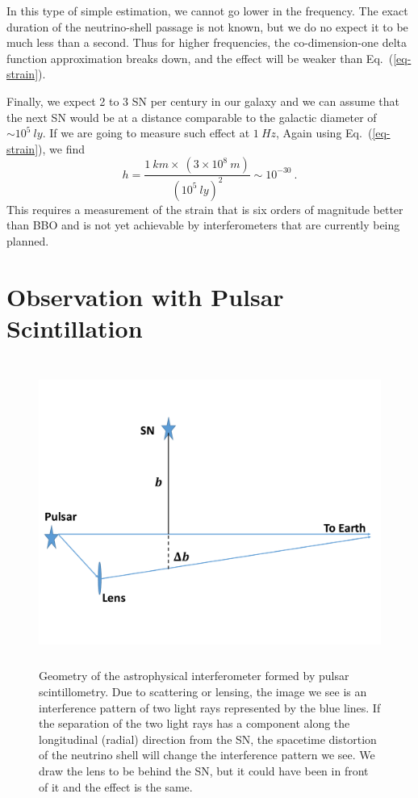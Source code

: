 \documentclass[aps,showpacs,onecolumn,floats,prd,superscriptaddress,nofootinbib]{revtex4-1}
\begin{document}
In this type of simple estimation, we cannot go lower in the frequency. The exact duration of the neutrino-shell passage is not known, but we do no expect it to be much less than a second. Thus for higher frequencies, the co-dimension-one delta function approximation breaks down, and the effect will be weaker than Eq.~(\ref{eq-strain}).

Finally, we expect 2 to 3 SN per century in our galaxy and we can assume that the next SN would be at a distance comparable to the galactic diameter of $\sim 10^5 \ ly$. If we are going to measure such effect at $1 \ Hz$, Again using Eq.~(\ref{eq-strain}), we find
\begin{equation}
	h = \frac{ 1~km \times ~ (3\times10^8~m)}{(10^5~ly)^2}\sim 10^{-30}~.
\end{equation}
This requires a measurement of the strain that is six orders of magnitude better than BBO and is not yet achievable by interferometers that are currently being planned. 

\section{Observation with Pulsar Scintillation}
\label{sec-scint}

\begin{figure}[h]
\begin{center}
\includegraphics[width=\textwidth,height=10cm]{Lens.pdf}
\caption{Geometry of the astrophysical interferometer formed by pulsar scintillometry. Due to scattering or lensing, the image we see is an interference pattern of two light rays represented by the blue lines. If the separation of the two light rays has a component along the longitudinal (radial) direction from the SN, the spacetime distortion of the neutrino shell will change the interference pattern we see. We draw the lens to be behind the SN, but it could have been in front of it and the effect is the same.}
\label{fig:4}
\end{center}
\end{figure}
\end{document}
